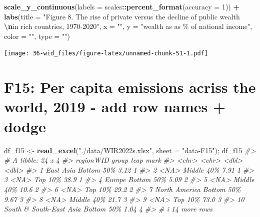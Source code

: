 \documentclass[
  xelatex, ja=standard]{bxjsbook}
\newenvironment{Shaded}{\begin{snugshade}}{\end{snugshade}}
\newcommand{\AttributeTok}[1]{\textcolor[rgb]{0.13,0.29,0.53}{#1}}
\newcommand{\CommentTok}[1]{\textcolor[rgb]{0.56,0.35,0.01}{\textit{#1}}}
\newcommand{\DecValTok}[1]{\textcolor[rgb]{0.00,0.00,0.81}{#1}}
\newcommand{\FunctionTok}[1]{\textcolor[rgb]{0.13,0.29,0.53}{\textbf{#1}}}
\newcommand{\NormalTok}[1]{#1}
\newcommand{\OtherTok}[1]{\textcolor[rgb]{0.56,0.35,0.01}{#1}}
\newcommand{\SpecialCharTok}[1]{\textcolor[rgb]{0.81,0.36,0.00}{\textbf{#1}}}
\newcommand{\StringTok}[1]{\textcolor[rgb]{0.31,0.60,0.02}{#1}}
\theoremstyle{definition}
\theoremstyle{definition}
\theoremstyle{definition}
\theoremstyle{definition}
\theoremstyle{remark}
\begin{document}
\begin{Shaded}
\begin{Highlighting}[]
  \FunctionTok{scale\_y\_continuous}\NormalTok{(}\AttributeTok{labels =}\NormalTok{ scales}\SpecialCharTok{::}\FunctionTok{percent\_format}\NormalTok{(}\AttributeTok{accuracy =} \DecValTok{1}\NormalTok{)) }\SpecialCharTok{+}
  \FunctionTok{labs}\NormalTok{(}\AttributeTok{title =} \StringTok{"Figure 8. The rise of private versus the decline of public wealth }
\StringTok{       }\SpecialCharTok{\textbackslash{}n}\StringTok{in rich countries, 1970{-}2020"}\NormalTok{, }
       \AttributeTok{x =} \StringTok{""}\NormalTok{, }\AttributeTok{y =} \StringTok{"wealth as as \% of national income"}\NormalTok{, }\AttributeTok{color =} \StringTok{""}\NormalTok{, }\AttributeTok{type =} \StringTok{""}\NormalTok{)}
\end{Highlighting}
\end{Shaded}

\texttt{[image: 36-wid\_files/figure-latex/unnamed-chunk-51-1.pdf]}

\hypertarget{f15-per-capita-emissions-acriss-the-world-2019---add-row-names-dodge}{%
\section{F15: Per capita emissions acriss the world, 2019 - add row names + dodge}\label{f15-per-capita-emissions-acriss-the-world-2019---add-row-names-dodge}}

\begin{Shaded}
\begin{Highlighting}[]
\NormalTok{df\_f15 }\OtherTok{\textless{}{-}} \FunctionTok{read\_excel}\NormalTok{(}\StringTok{"./data/WIR2022s.xlsx"}\NormalTok{, }\AttributeTok{sheet =} \StringTok{"data{-}F15"}\NormalTok{); df\_f15}
\CommentTok{\#\textgreater{} \# A tibble: 24 x 4}
\CommentTok{\#\textgreater{}    regionWID               group       tcap  mark}
\CommentTok{\#\textgreater{}    \textless{}chr\textgreater{}                   \textless{}chr\textgreater{}      \textless{}dbl\textgreater{} \textless{}dbl\textgreater{}}
\CommentTok{\#\textgreater{}  1 East Asia               Bottom 50\%  3.12     1}
\CommentTok{\#\textgreater{}  2 \textless{}NA\textgreater{}                    Middle 40\%  7.91     1}
\CommentTok{\#\textgreater{}  3 \textless{}NA\textgreater{}                    Top 10\%    38.9      1}
\CommentTok{\#\textgreater{}  4 Europe                  Bottom 50\%  5.09     2}
\CommentTok{\#\textgreater{}  5 \textless{}NA\textgreater{}                    Middle 40\% 10.6      2}
\CommentTok{\#\textgreater{}  6 \textless{}NA\textgreater{}                    Top 10\%    29.2      2}
\CommentTok{\#\textgreater{}  7 North America           Bottom 50\%  9.67     3}
\CommentTok{\#\textgreater{}  8 \textless{}NA\textgreater{}                    Middle 40\% 21.7      3}
\CommentTok{\#\textgreater{}  9 \textless{}NA\textgreater{}                    Top 10\%    73.0      3}
\CommentTok{\#\textgreater{} 10 South \& South{-}East Asia Bottom 50\%  1.04     4}
\CommentTok{\#\textgreater{} \# i 14 more rows}
\end{Highlighting}
\end{Shaded}
\end{document}
